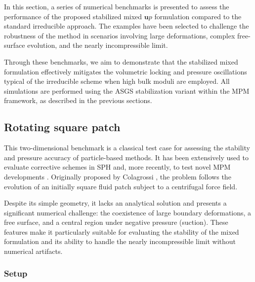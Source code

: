 \documentclass[11pt,english]{article}
\def\up{$\boldsymbol{u}p$\xspace}
\begin{document}
In this section, a series of numerical benchmarks is presented to assess the performance of the proposed stabilized mixed \up formulation compared to the standard irreducible approach. The examples have been selected to challenge the robustness of the method in scenarios involving large deformations, complex free-surface evolution, and the nearly incompressible limit. 

Through these benchmarks, we aim to demonstrate that the stabilized mixed formulation effectively mitigates the volumetric locking and pressure oscillations typical of the irreducible scheme when high bulk moduli are employed. All simulations are performed using the ASGS stabilization variant within the MPM framework, as described in the previous sections.

\subsection{Rotating square patch}

    This two-dimensional benchmark is a classical test case for assessing the stability and pressure accuracy of particle-based methods. It has been extensively used to evaluate corrective schemes in SPH \cite{oger2016sph,morikawa2023corrected} and, more recently, to test novel MPM developments \cite{chandra2024stabilized}. Originally proposed by Colagrossi \cite{colagrossi2005meshless}, the problem follows the evolution of an initially square fluid patch subject to a centrifugal force field. 
    
    Despite its simple geometry, it lacks an analytical solution and presents a significant numerical challenge: the coexistence of large boundary deformations, a free surface, and a central region under negative pressure (suction). These features make it particularly suitable for evaluating the stability of the mixed formulation and its ability to handle the nearly incompressible limit without numerical artifacts.

\subsubsection{Setup}
\end{document}
